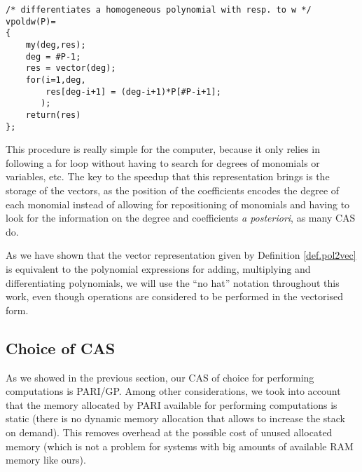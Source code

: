 \begin{center}
\begin{minipage}{0.8\textwidth}
\begin{lstlisting}[caption={Function for differentiating by $\z$.}]
/* differentiates a homogeneous polynomial with resp. to w */
vpoldw(P)=
{
    my(deg,res);
    deg = #P-1;
    res = vector(deg);
    for(i=1,deg,
        res[deg-i+1] = (deg-i+1)*P[#P-i+1];
       );
    return(res)
};
\end{lstlisting}
\end{minipage}
\end{center}

This procedure is really simple for the computer, because it only relies in following a for loop without having to search for degrees of monomials or variables, etc. The key to the speedup that this representation brings is the storage of the vectors, as the position of the coefficients encodes the degree of each monomial instead of allowing for repositioning of monomials and having to look for the information on the degree and coefficients \emph{a posteriori}, as many CAS do.

\begin{observacio}
As we have shown that the vector representation given by Definition \ref{def.pol2vec} is equivalent to the polynomial expressions for adding, multiplying and differentiating polynomials, we will use the ``no hat'' notation throughout this work, even though operations are considered to be performed in the vectorised form.
\end{observacio}




\subsection{Choice of CAS}

As we showed in the previous section, our CAS of choice for performing computations is PARI/GP. Among other considerations, we took into account that the memory allocated by PARI available for performing computations is static (there is no dynamic memory allocation that allows to increase the stack on demand). This removes overhead at the possible cost of unused allocated memory (which is not a problem for systems with big amounts of available RAM memory like ours).

